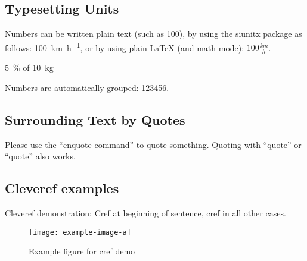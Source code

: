 \documentclass[runningheads,a4paper,ngerman]{llncs}[2022/01/12]
\begin{document}

\subsection{Typesetting Units}

\begin{ltgexample}
Numbers can be written plain text (such as 100), by using the siunitx package as follows:
\SI{100}{\km\per\hour},
or by using plain \LaTeX{} (and math mode):
$100 \frac{\mathit{km}}{h}$.
\end{ltgexample}

\begin{ltgexample}
\SI{5}{\percent} of \SI{10}{kg}
\end{ltgexample}

\begin{ltgexample}
Numbers are automatically grouped: \num{123456}.
\end{ltgexample}

\subsection{Surrounding Text by Quotes}

\begin{ltgexample}
Please use the \enquote{enquote command} to quote something.
Quoting with "`quote"' or ``quote'' also works.

\end{ltgexample}

\subsection{Cleveref examples}
\label{sec:ex:cref}

Cleveref demonstration: Cref at beginning of sentence, cref in all other cases.

\begin{figure}
    \centering
    \texttt{[image: example-image-a]}
    \caption{Example figure for cref demo}
    \label{fig:ex:cref}
\end{figure}
\end{document}
